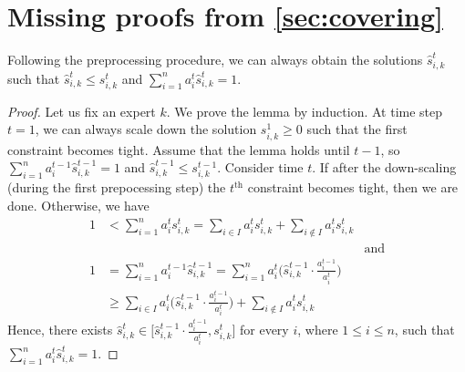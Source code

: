 
\section{Missing proofs from \cref{sec:covering}} \label{appix-proofs}

\setcounter{theorem}{2}
\begin{lemma}
    Following the preprocessing procedure, we can always obtain the solutions $\hat{s}_{i,k}^{t}$ such that
    $\hat{s}_{i,k}^{t} \leq s_{i,k}^{t}$ and $\sum_{i=1}^{n} a_{i}^{t} \hat{s}_{i,k}^{t} = 1$.
\end{lemma}
%
\begin{proof}
Let us fix an expert $k$. We prove the lemma by induction. At time step $t=1$, we can always scale down the solution $s_{i,k}^{1} \geq 0$ such that the first constraint becomes tight.
Assume that the lemma holds until $t-1$, so $\sum_{i=1}^{n} a_{i}^{t-1} \hat{s}_{i,k}^{t-1} = 1$ and $\hat{s}_{i,k}^{t-1} \leq s_{i,k}^{t-1}$.
Consider time $t$. If after the down-scaling (during the first prepocessing step) the $t^{\text{th}}$ constraint becomes tight, then we are done. Otherwise, we have
    \begin{align*}
        1 &< \sum_{i=1}^{n} a_{i}^{t} s_{i,k}^{t} = \sum_{i \in I} a_{i}^{t} s_{i,k}^{t} + \sum_{i \notin I} a_{i}^{t} s_{i,k}^{t}  & \\
        & & \text{and} \\
        1 &= \sum_{i=1}^{n} a_{i}^{t-1} \hat{s}_{i,k}^{t-1} =  \sum_{i = 1}^{n} a_{i}^{t} \biggl( \hat{s}_{i,k}^{t-1} \cdot \frac{a_{i}^{t-1}}{a_{i}^{t}} \biggr) & \\
        &\geq  \sum_{i \in I} a_{i}^{t} \biggl( \hat{s}_{i,k}^{t-1} \cdot \frac{a_{i}^{t-1}}{a_{i}^{t}} \biggr)
        + \sum_{i \notin I} a_{i}^{t} s_{i,k}^{t} &
    \end{align*}
    Hence, there exists $\hat{s}_{i,k}^{t} \in \bigl[ \hat{s}_{i,k}^{t-1} \cdot \frac{a_{i}^{t-1}}{a_{i}^{t}}, s_{i,k}^{t} \bigr]$ for every $i$, where $1 \leq i \leq n$, such that $\sum_{i=1}^{n} a_{i}^{t} \hat{s}_{i,k}^{t} = 1$.
\end{proof}

